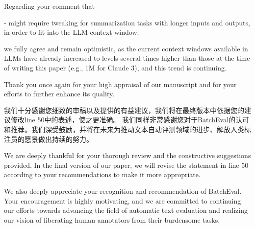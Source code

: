 Regarding your comment that

- might require tweaking for summarization tasks with longer inputs and outputs, in order to fit into the LLM context window.

we fully agree and remain optimistic, as the current context windows available in LLMs have already increased to levels several times higher than those at the time of writing this paper (e.g., 1M for Claude 3), and this trend is continuing.

Thank you once again for your high appraisal of our manuscript and for your efforts to further enhance its quality.


我们十分感谢您细致的审稿以及提供的有益建议，我们将在最终版本中依据您的建议修改line 50中的表述，使之更准确。
我们同样非常感谢您对于BatchEval的认可和推荐。我们深受鼓励，并将在未来为推动文本自动评测领域的进步、解放人类标注员的愿景做出持续的努力。


We are deeply thankful for your thorough review and the constructive suggestions provided. In the final version of our paper, we will revise the statement in line 50 according to your recommendations to make it more appropriate.

We also deeply appreciate your recognition and recommendation of BatchEval. Your encouragement is highly motivating, and we are committed to continuing our efforts towards advancing the field of automatic text evaluation and realizing our vision of liberating human annotators from their burdensome tasks.

